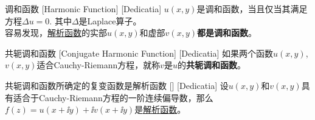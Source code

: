 \documentclass[UTF8]{ctexart}
\newcommand{\AnalyticalFunction}{\hyperref[dfn:AnalyticalFunction]{解析函数}}
\begin{document}
\begin{dfn}
    [UUID]
    {调和函数}
    [Harmonic Function]
    [Dedicatia]
    $u(x,y)$是调和函数，当且仅当其满足方程$\Delta u=0$. 其中$\Delta$是Laplace算子。\\
    容易发现，\AnalyticalFunction 的实部$u(x,y)$和虚部$v(x,y)$\textbf{都是调和函数}。
\end{dfn}
\begin{dfn}
    [UUID]
    {共轭调和函数}
    [Conjugate Harmonic Function]
    [Dedicatia]
    如果两个函数$u(x,y)$, $v(x,y)$适合Cauchy-Riemann方程，就称$v$是$u$的\textbf{共轭调和函数}。
\end{dfn}
\begin{thm}
    [UUID]
    {共轭调和函数所确定的复变函数是解析函数}
    []
    [Dedicatia]
    设$u(x,y)$和$v(x,y)$具有适合于Cauchy-Riemann方程的一阶连续偏导数，那么$f(z)=u(x+\ii y)+\ii v(x+\ii y)$是\AnalyticalFunction 。
\end{thm}
\end{document}
